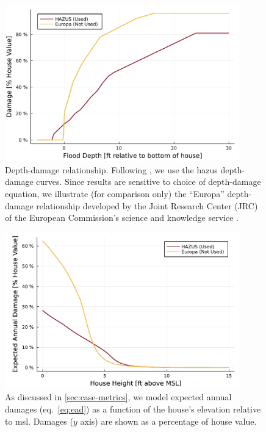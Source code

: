 \documentclass[11pt]{article}
\begin{document}
\begin{figure}
    \centering
    \includegraphics[width=4in]{cost-depth-damage}
    \caption{
        Depth-damage relationship.
        Following \citet{zarekarizi_suboptimal:2020}, we use the \gls{hazus} depth-damage curves.
        Since results are sensitive to choice of depth-damage equation, we illustrate (for comparison only) the ``Europa'' depth-damage relationship developed by the Joint Research Center (JRC) of the European Commission's science and knowledge service \citep{huizinga_depthdamage:2016}.
    }\label{fig:cost-depth-damage}
\end{figure}

\begin{figure}
    \centering
    \includegraphics[width=4in]{cost-expected-damage-emulator}
    \caption{
        As discussed in \cref{sec:case-metrics}, we model expected annual damages (eq.~\ref{eq:ead}) as a function of the house's elevation relative to \gls{msl}.
        Damages ($y$ axis) are shown as a percentage of house value.
    }\label{fig:cost-expected-damage-emulator}
\end{figure}
\end{document}

